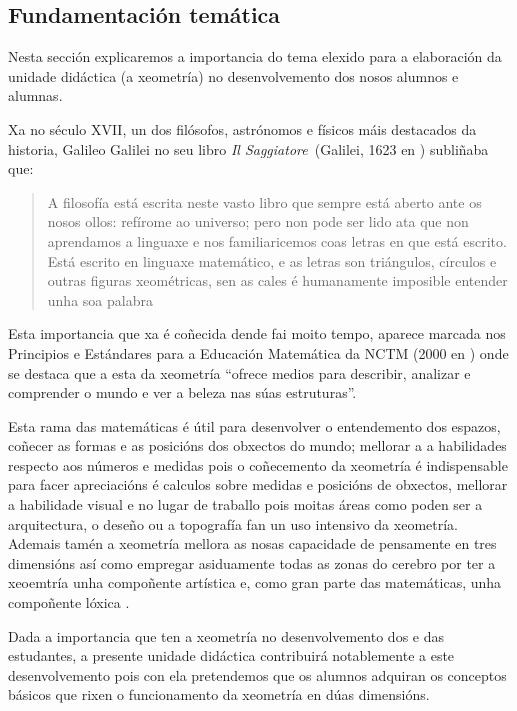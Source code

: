 \subsection{Fundamentación temática}

Nesta sección explicaremos a importancia do tema elexido para a elaboración da unidade didáctica (a xeometría) no desenvolvemento dos nosos alumnos e alumnas.

Xa no século XVII, un dos filósofos, astrónomos e físicos máis destacados da historia, Galileo Galilei no seu libro \emph{Il Saggiatore}~(Galilei, 1623 en ) subliñaba que:
\begin{quote}
\vspace{-0.3\baselineskip}
A filosofía está escrita neste vasto libro que sempre está aberto ante os nosos ollos: refírome ao universo; pero non pode ser lido ata que non aprendamos a linguaxe e nos familiaricemos coas letras en que está escrito. Está escrito en linguaxe matemático, e as letras son triángulos, círculos e outras figuras xeométricas, sen as cales é humanamente imposible entender unha soa palabra
\vspace{-0.6\baselineskip}
\end{quote}

Esta importancia que xa é coñecida dende fai moito tempo, aparece marcada nos Principios e Estándares para a Educación Matemática da NCTM (2000 en ) onde se destaca que a esta da xeometría ``ofrece medios para describir, analizar e comprender o mundo e ver a beleza nas súas estruturas''.

Esta rama das matemáticas é útil para desenvolver o entendemento dos espazos, coñecer as formas e as posicións dos obxectos do mundo; mellorar a a habilidades respecto aos números e medidas pois o coñecemento da xeometría é indispensable para facer apreciacións é calculos sobre medidas e posicións de obxectos, mellorar a habilidade visual e no lugar de traballo pois moitas áreas como poden ser a arquitectura, o deseño ou a topografía fan un uso intensivo da xeometría. Ademais tamén a xeometría mellora as nosas capacidade de pensamente en tres dimensións así como empregar asiduamente todas as zonas do cerebro por ter a xeoemtría unha compoñente artística e, como gran parte das matemáticas, unha compoñente lóxica \cite{shockingreasons}.

Dada a importancia que ten a xeometría no desenvolvemento dos e das estudantes, a presente unidade didáctica contribuirá notablemente a este desenvolvemento pois con ela pretendemos que os alumnos adquiran os conceptos básicos que rixen o funcionamento da xeometría en dúas dimensións.
